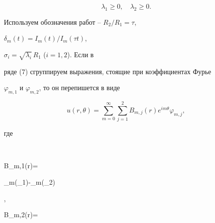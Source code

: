 \begin{equation} 


\lambda_1\ge 0,\quad \lambda_2\ge 0. 


\end{equation} 


 


Используем обозначения работ \cite{1}--\cite{3} $R_2/R_1=\tau$, 


$\delta_m(t)=I_m(t)/I_m(\tau t)$, 


$\sigma_i=\sqrt{\lambda_i}\,R_1$ ($i=1,2$). Если в 


ряде (7) сгруппируем выражения, стоящие при коэффициентах Фурье 


$\varphi_{m,1}$ и $\varphi_{m,2}$, то он перепишется в виде 


\begin{equation} 


u(r,\theta)=\sum^\infty_{m=0}\sum^2_{j=1}B_{m,j}(r) 


e^{im\theta}\varphi_{m,j}, 


\end{equation} 


где 


$$ 


B_{m,1}(r)= 




{\delta_m(\sigma_1)-\delta_m(\sigma_2)} 


,


\qquad 


% 


B_{m,2}(r)= 




